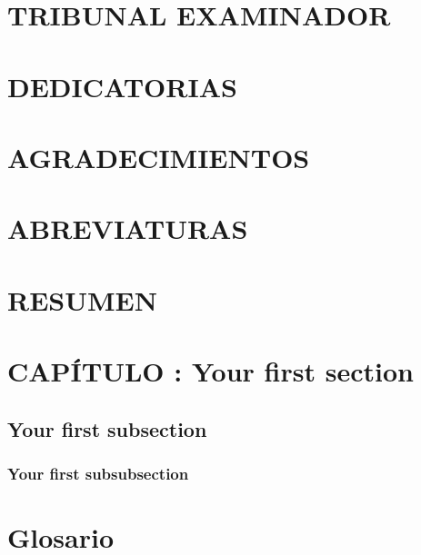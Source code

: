 \documentclass[letterpaper,12pt,doc,natbib]{apa6}
\begin{document}



\section{\uppercase{Tribunal examinador}}


\section{\uppercase{Dedicatorias}}


\section{\uppercase{Agradecimientos}}


\section{\uppercase{Abreviaturas}}


\section{\uppercase{Resumen}}


\tableofcontents
\listoffigures
\listoftables


\section{CAPÍTULO  : Your first section}

\subsection{Your first subsection}

\subsubsection{Your first subsubsection}


\section*{Glosario}



\end{document}
